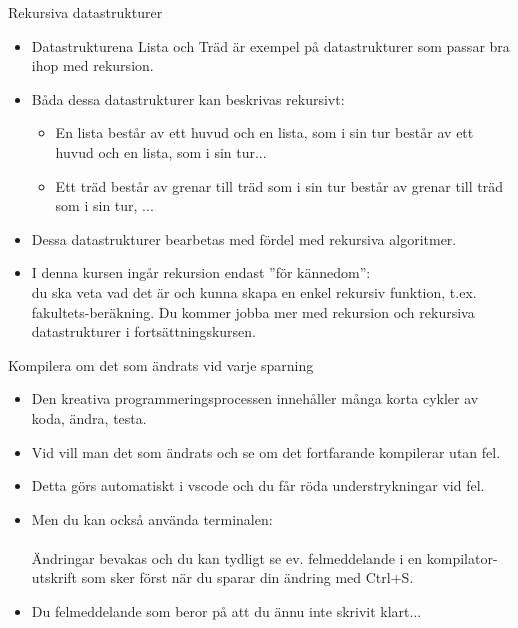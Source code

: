 \begin{Slide}{Rekursiva datastrukturer}\SlideFontSmall
\begin{itemize}\SlideFontSmall
\item Datastrukturena Lista och Träd är exempel på datastrukturer som passar bra ihop med rekursion.
\item Båda dessa datastrukturer kan beskrivas rekursivt:
\begin{itemize}\SlideFontSmall
\item En lista består av ett huvud och en lista, som i sin tur består av ett huvud och en lista, som i sin tur...
\item Ett träd består av grenar till träd som i sin tur består av grenar till träd som i sin tur, ...
\end{itemize}\SlideFontSmall
\item Dessa datastrukturer bearbetas med fördel med rekursiva algoritmer.
\item I denna kursen ingår rekursion endast ''för kännedom'': \\ du ska veta vad det är och kunna skapa en enkel rekursiv funktion, t.ex. fakultets-beräkning. Du kommer jobba mer med rekursion och rekursiva datastrukturer i fortsättningskursen.
\end{itemize}
\ifkompendium\else
{}
\fi
\end{Slide}


\begin{Slide}{Kompilera om det som ändrats vid varje sparning}
\begin{itemize}\SlideFontSmall
  \item Den kreativa programmeringsprocessen innehåller många korta cykler av koda, ändra, testa.
  \item Vid  vill man  det som ändrats och se om det fortfarande kompilerar utan fel.
  \item Detta görs automatiskt i vscode och du får röda understrykningar vid fel.
  \item Men du kan också använda terminalen:\\\\Ändringar bevakas och du kan tydligt se ev. felmeddelande i en kompilator-utskrift som sker först när du sparar din ändring med Ctrl+S.
  \item Du  felmeddelande som beror på att du ännu inte skrivit klart...

\end{itemize}
\end{Slide}

